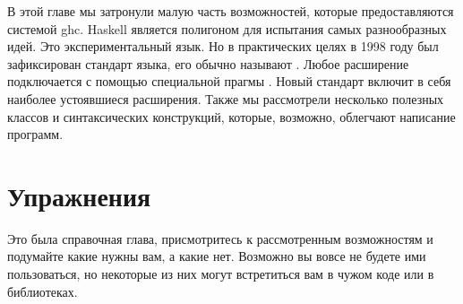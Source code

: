 В этой главе мы затронули малую часть возможностей,
которые предоставляются системой ghc. Haskell является
полигоном для испытания самых разнообразных идей. 
Это экспериментальный язык. Но в практических целях в 1998
году был зафиксирован стандарт языка, его обычно называют
. Любое расширение
подключается с помощью специальной прагмы .
Новый стандарт  включит в себя наиболее
устоявшиеся расширения. Также мы рассмотрели несколько полезных классов
и синтаксических конструкций, которые, возможно, облегчают написание
программ.

\section{Упражнения}

Это была справочная глава, присмотритесь к рассмотренным возможностям
и подумайте какие нужны вам, а какие нет. Возможно вы вовсе не будете
ими пользоваться, но некоторые из них могут встретиться вам в 
чужом коде или в библиотеках. 


